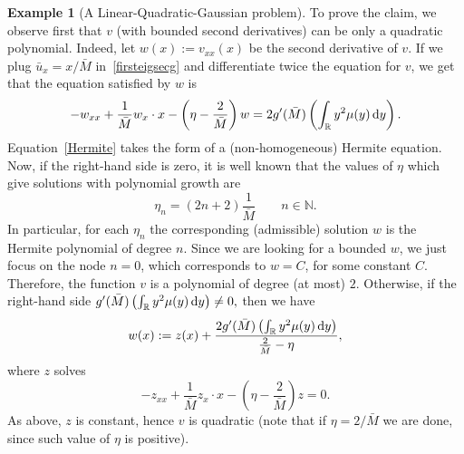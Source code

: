\documentclass[10pt,a4paper,nouppercase,nowrite]{article}
\numberwithin{equation}{section}
\newcommand{\di}{{\rm d}}
\newcommand{\R}{\mathbb{R}}
\theoremstyle{definition}
\newtheorem{exmpl}[defn]{Example}
\begin{document}
\begin{exmpl}[A Linear-Quadratic-Gaussian problem]
To prove the claim, we observe first that $v$ (with bounded second derivatives) can be only a quadratic polynomial. Indeed, let $w(x):=v_{xx}(x)$ be the second derivative of $v$. If we plug $\bar u_x = x/\bar M$  in~\eqref{firsteigsecg} and differentiate twice the equation for $v$, we get that the equation satisfied by $w$ is
\begin{equation} \label{Hermite}
	-w_{xx} + \frac{1}{\bar M} w_x \cdot x - \left (\eta - \frac{2}{\bar M}\right) w = 2g'(\bar M) \left( \int_{\R} y^2 \mu(y) \, \di y \right).
\end{equation}
Equation~\eqref{Hermite} takes the form of a (non-homogeneous) Hermite equation. Now, if the right-hand side is zero, it is well known that the values of $\eta$ which give solutions with polynomial growth are
$$\eta_n = (2n+2) \frac{1}{\bar M} \qquad n \in \mathbb{N}.$$
In particular, for each $\eta_n$ the corresponding (admissible) solution $w$ is the Hermite polynomial of degree $n$. Since we are looking for a bounded $w$, we just focus on the node $n=0$, which corresponds to $w=C$, for some constant $C$. Therefore, the function $v$ is a polynomial of degree (at most) $2$. Otherwise, if the right-hand side $g'(\bar M) \left( \int_{\R} y^2 \mu(y) \, \di y \right) \neq 0,$ then we have
$$w(x):=z(x)+\frac{2 g'(\bar M) \left( \int_{\R} y^2 \mu(y) \, \di y \right)}{\frac{2}{\bar M} - \eta},$$
where $z$ solves
$$-z_{xx} + \frac{1}{\bar M} z_x \cdot x - \left( \eta-\frac{2}{\bar M} \right) z = 0.$$
As above, $z$ is constant, hence $v$ is quadratic (note that if $\eta = 2/\bar M$ we are done, since such value of $\eta$ is positive).


\end{exmpl}
\end{document}
